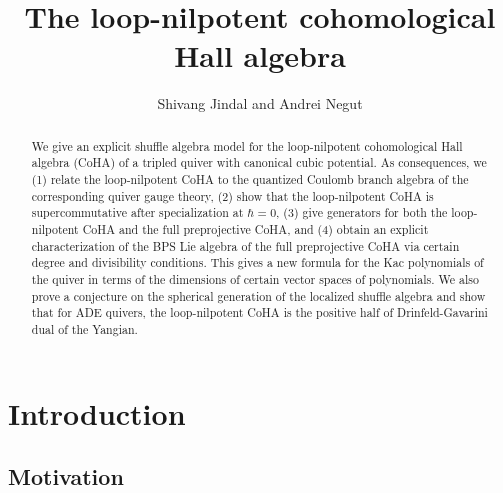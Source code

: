 \documentclass{amsart}
\begin{document}
\title[The loop-nilpotent cohomological Hall algebra]{\Large{\textbf{The loop-nilpotent cohomological Hall algebra}}} 

\author[Shivang Jindal and Andrei Negu\cb t]{Shivang Jindal and Andrei Negu\cb t}

\address{École Polytechnique Fédérale de Lausanne (EPFL), Lausanne, Switzerland} 

\address{École Polytechnique Fédérale de Lausanne (EPFL), Lausanne, Switzerland \newline \text{ } \ \ Simion Stoilow Institute of Mathematics (IMAR), Bucharest, Romania} 
	
\begin{abstract} We give an explicit shuffle algebra model for the loop-nilpotent cohomological Hall algebra (CoHA) of a tripled quiver with canonical cubic potential. As consequences, we (1) relate the loop-nilpotent CoHA to the quantized Coulomb branch algebra of the corresponding quiver gauge theory, (2) show that the loop-nilpotent CoHA is supercommutative after specialization at $\hbar=0$, (3) give generators for both the loop-nilpotent CoHA and the full preprojective CoHA, and (4) obtain an explicit characterization of the BPS Lie algebra of the full preprojective CoHA via certain degree and divisibility conditions. This gives a new formula for the Kac polynomials of the quiver in terms of the dimensions of certain vector spaces of polynomials. We also prove a conjecture on the spherical generation of the localized shuffle algebra and show that for ADE quivers, the loop-nilpotent CoHA is the positive half of Drinfeld-Gavarini dual of the Yangian. \end{abstract}

\maketitle

\bigskip

\section{Introduction}
\label{sec:intro}

\medskip

\subsection{Motivation}
\label{sub:motivation intro}
\end{document}
